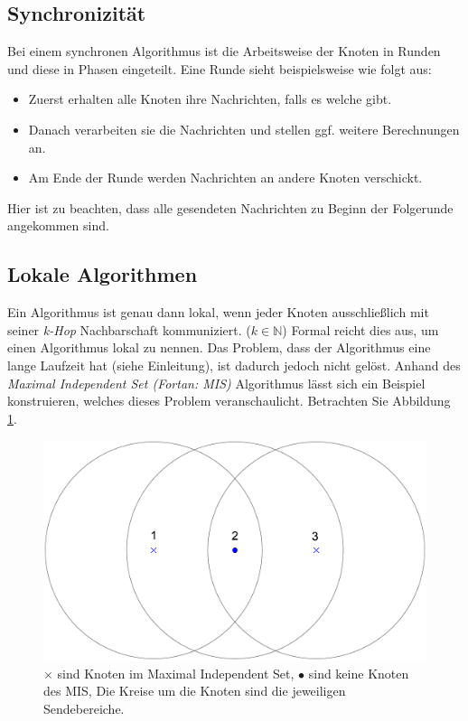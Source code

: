 \documentclass[a4paper,twoside]{IEEEtran}
\begin{document}
\subsection{Synchronizität}
Bei einem synchronen Algorithmus ist die Arbeitsweise der Knoten in Runden und diese in Phasen eingeteilt. 
Eine Runde sieht beispielsweise wie folgt aus:
\begin{itemize}
\item Zuerst erhalten alle Knoten ihre Nachrichten, falls es welche gibt.
\item Danach verarbeiten sie die Nachrichten und stellen ggf. weitere Berechnungen an.
\item Am Ende der Runde werden Nachrichten an andere Knoten verschickt.
\end{itemize}
Hier ist zu beachten, dass alle gesendeten Nachrichten zu Beginn der Folgerunde angekommen sind.

\subsection{Lokale Algorithmen} \label{lokal}
Ein Algorithmus ist genau dann lokal, wenn jeder Knoten ausschließlich mit seiner \emph{k-Hop} Nachbarschaft kommuniziert. ($k \in \mathds{N}$)
Formal reicht dies aus, um einen Algorithmus lokal zu nennen.
Das Problem, dass der Algorithmus eine lange Laufzeit hat (siehe Einleitung), ist dadurch jedoch nicht gelöst.
Anhand des \emph{Maximal Independent Set (Fortan: MIS)} Algorithmus lässt sich ein Beispiel konstruieren, welches dieses Problem veranschaulicht.
Betrachten Sie Abbildung \ref{fig:MIS}.

\begin{figure}[h!]
\centering
\includegraphics[width=0.99\linewidth]{MIS.eps}
\caption{$\times $ sind Knoten im Maximal Independent Set, $\bullet $ sind keine Knoten des MIS, Die Kreise um die Knoten sind die jeweiligen Sendebereiche.}
\label{fig:MIS}
\end{figure}
\end{document}
